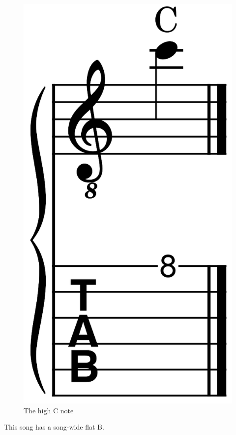 \begin{figure}[h]
	\centering
	\includegraphics[height=0.12\textheight]{../../MuseScore/Guitar/GuitarNotesHighC.png}
	\caption{The high C note}
	\label{fig:guitar_note_high_c}
\end{figure}

This song has a song-wide flat B.

